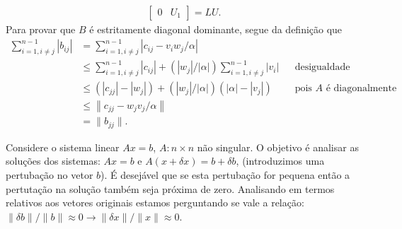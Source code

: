\begin{questions}
\begin{solution}
\begin{align*}
\begin{bmatrix}
                0 & U_1
            \end{bmatrix} = L U.
        \end{align*}
        Para provar que $B$ \'{e} estritamente diagonal dominante, segue da defini\c{c}\~{a}o que
        \begin{align*}
            \sum_{i = 1, i \neq j}^{n - 1} | b_{ij} | &= \sum_{i = 1, i \neq j}^{n - 1} | c_{ij} - v_i w_j / \alpha | \\
            &\leq \sum_{i = 1, i \neq j}^{n - 1} | c_{ij} | + \left( | w_j | / | \alpha | \right) \sum_{i = 1, i \neq j}^{n - 1} | v_i | && \text{desigualdade triangular} \\
            &\leq \left( | c_{jj} | - | w_j | \right) + \left( | w_j | / | \alpha | \right) \left( | \alpha | - | v_j | \right) && \text{pois $A$ \'{e} diagonalmente dominante} \\
            &\leq \left\| c_{jj} - w_j v_j / \alpha \right\| \\
            &= \| b_{jj} \|.
        \end{align*}
    \end{solution}

    \question Considere o sistema linear $A x = b$, $A : n \times n$ n\~{a}o singular. O objetivo \'{e} analisar as solu\c{c}\~{o}es dos sistemas: $A x = b$ e $A (x + \delta x) = b + \delta b$, (introduzimos uma pertuba\c{c}\~{a}o no vetor $b$). \'{E} desej\'{a}vel que se esta pertuba\c{c}\~{a}o for pequena ent\~{a}o a pertuta\c{c}\~{a}o na solu\c{c}\~{a}o tamb\'{e}m seja pr\'{o}xima de zero. Analisando em termos relativos aos vetores originais estamos perguntando se vale a rela\c{c}\~{a}o: $\| \delta b\| / \| b \| \approx 0 \rightarrow \| \delta x \| / \| x \| \approx 0$.
    

\end{questions}
